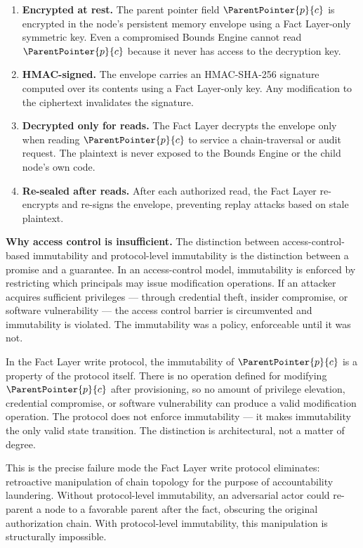 \begin{enumerate}
    \item \textbf{Encrypted at rest.} The parent pointer field $\ParentPointer{p}{c}$ is encrypted in the node's persistent memory envelope using a Fact Layer-only symmetric key. Even a compromised Bounds Engine cannot read $\ParentPointer{p}{c}$ because it never has access to the decryption key.

    \item \textbf{HMAC-signed.} The envelope carries an HMAC-SHA-256 signature computed over its contents using a Fact Layer-only key. Any modification to the ciphertext invalidates the signature.

    \item \textbf{Decrypted only for reads.} The Fact Layer decrypts the envelope only when reading $\ParentPointer{p}{c}$ to service a chain-traversal or audit request. The plaintext is never exposed to the Bounds Engine or the child node's own code.

    \item \textbf{Re-sealed after reads.} After each authorized read, the Fact Layer re-encrypts and re-signs the envelope, preventing replay attacks based on stale plaintext.
\end{enumerate}

\medskip
\noindent\textbf{Why access control is insufficient.} The distinction between access-control-based immutability and protocol-level immutability is the distinction between a promise and a guarantee. In an access-control model, immutability is enforced by restricting which principals may issue modification operations. If an attacker acquires sufficient privileges --- through credential theft, insider compromise, or software vulnerability --- the access control barrier is circumvented and immutability is violated. The immutability was a policy, enforceable until it was not.

In the Fact Layer write protocol, the immutability of $\ParentPointer{p}{c}$ is a property of the protocol itself. There is no operation defined for modifying $\ParentPointer{p}{c}$ after provisioning, so no amount of privilege elevation, credential compromise, or software vulnerability can produce a valid modification operation. The protocol does not enforce immutability --- it makes immutability the only valid state transition. The distinction is architectural, not a matter of degree.

This is the precise failure mode the Fact Layer write protocol eliminates: retroactive manipulation of chain topology for the purpose of accountability laundering. Without protocol-level immutability, an adversarial actor could re-parent a node to a favorable parent after the fact, obscuring the original authorization chain. With protocol-level immutability, this manipulation is structurally impossible.

